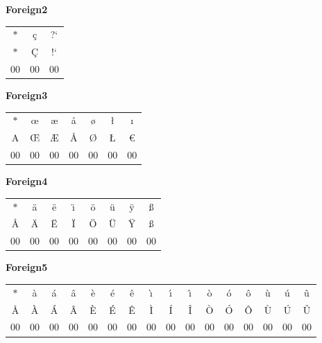 \documentclass[12pt]{report}
\newlength{\mine}
\newlength{\niz}
\def\pmb{}
\begin{document}
\textbf{Foreign2}
\par\nobreak\vspace{2mm}
\begin{tabular}{|c|cc|}
  \hline
   $\pmb *$&
   \c{c}   &
   ?`      \\[\mine]
   $\pmb *$&
   \c{C}   &
   !`      \\[\niz]
  \hline\hline
  00&00&00\\
  \hline
\end{tabular}
\goodbreak\par\vspace{3mm}

\textbf{Foreign3}
\par\nobreak\vspace{2mm}
\begin{tabular}{|c|cccccc|}
  \hline
   $\pmb *$&
   \oe  &
   \ae  &
   \aa  &
   \o   &
   \l   &
   \i   \\[\mine]
   A    &
   \OE  &
   \AE  &
   \AA  &
   \O   &
   \L   &
   \euro \\[\niz]
  \hline\hline
  00&00&00&00&00&00&00\\
  \hline
\end{tabular}
\goodbreak\par\vspace{3mm}

\textbf{Foreign4}
\par\nobreak\vspace{2mm}
\begin{tabular}{|c|ccccccc|}
  \hline
   $\pmb *$&
   \"{a} &
   \"{e} &
   \"{\i} &
   \"{o} &
   \"{u} &
   \"{y} &
   \ss   \\[\mine]
   \AA  &
   \"{A} &
   \"{E} &
   \"{I} &
   \"{O} &
   \"{U} &
   \"{Y} &
   {\large\ss} \\[\niz]
  \hline\hline
  00&00&00&00&00&00&00&00\\
  \hline
\end{tabular}
\goodbreak\par\vspace{3mm}

\textbf{Foreign5}
\par\nobreak\vspace{2mm}
\begin{tabular}{|c|ccccccccccccccc|}
  \hline
   $\pmb *$&
   \`{a} &
   \'{a} &
   \^{a} &
   \`{e} &
   \'{e} &
   \^{e} &
   \`{\i} &
   \'{\i} &
   \^{\i} &
   \`{o} &
   \'{o} &
   \^{o} &
   \`{u} &
   \'{u} &
   \^{u} \\[\mine]
   \AA  &
   \`{A} &
   \'{A} &
   \^{A} &
   \`{E} &
   \'{E} &
   \^{E} &
   \`{I} &
   \'{I} &
   \^{I} &
   \`{O} &
   \'{O} &
   \^{O} &
   \`{U} &
   \'{U} &
   \^{U} \\[\niz]
  \hline\hline
  00&00&00&00&00&00&00&00&00&00&00&00&00&00&00&00\\
  \hline
\end{tabular}
\goodbreak\par\vspace{3mm}
\end{document}

